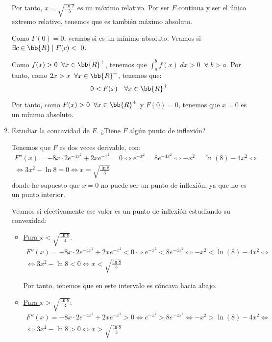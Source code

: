\documentclass[12pt]{article}
\begin{document}
\begin{ejercicio}
\begin{enumerate}
    Por tanto, $x=\sqrt{\frac{\ln 2}{3}}$ es un máximo relativo. Por ser $F$ continua y ser el único extremo relativo, tenemos que es también máximo absoluto.

    Como $F(0)=0$, veamos si es un mínimo absoluto. Veamos si $\exists c\in \bb{R}\mid F(c)<~0$.
    
    Como $f(x)> 0 \;\;\forall x\in \bb{R}^+$, tenemos que $\int_a^b f(x)\;dx > 0 \;\;\forall\; b>a$. Por tanto, como $2x>x \;\;\forall x\in \bb{R}^+$, tenemos que:
    \begin{equation*}
        0< F(x) \quad \forall x\in \bb{R}^+
    \end{equation*}

    Por tanto, como $F(x)>0 \;\;\forall x\in \bb{R}^+$ y $F(0)=0$, tenemos que $x=0$ es un mínimo absoluto.

    \item Estudiar la concavidad de $F$. ¿Tiene $F$ algún punto de inflexión?

    Tenemos que $F$ es dos veces derivable, con:
    \begin{multline*}
        F''(x)=-8x\cdot 2e^{-4x^2} +2xe^{-x^2} = 0 \Longleftrightarrow
        e^{-x^2}=8e^{-4x^2} \Longleftrightarrow -x^2=\ln (8)- 4x^2
        \Longleftrightarrow \\ \Longleftrightarrow
        3x^2-\ln 8=0 \Longleftrightarrow x=\sqrt{\frac{\ln 8}{3}}
    \end{multline*}
    donde he supuesto que $x=0$ no puede ser un punto de inflexión, ya que no es un punto interior.

    Veamos si efectivamente ese valor es un punto de inflexión estudiando su convexidad:
    \begin{itemize}
        \item \underline{Para $x<\sqrt{\frac{\ln 8}{3}}$}:
        \begin{multline*}
            F''(x)=-8x\cdot 2e^{-4x^2} +2xe^{-x^2} < 0 \Longleftrightarrow
            e^{-x^2}<8e^{-4x^2} \Longleftrightarrow -x^2<\ln (8)- 4x^2
            \Longleftrightarrow \\ \Longleftrightarrow
            3x^2-\ln 8<0 \Longleftrightarrow x<\sqrt{\frac{\ln 8}{3}}
        \end{multline*}

        Por tanto, tenemos que en este intervalo es cóncava hacia abajo.

        \item \underline{Para $x>\sqrt{\frac{\ln 8}{3}}$}:
        \begin{multline*}
            F''(x)=-8x\cdot 2e^{-4x^2} +2xe^{-x^2} > 0 \Longleftrightarrow
            e^{-x^2}>8e^{-4x^2} \Longleftrightarrow -x^2>\ln (8)- 4x^2
            \Longleftrightarrow \\ \Longleftrightarrow
            3x^2-\ln 8>0 \Longleftrightarrow x>\sqrt{\frac{\ln 8}{3}}
        \end{multline*}


\end{itemize}
\end{enumerate}
\end{ejercicio}
\end{document}
